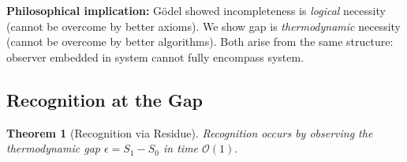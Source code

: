 \documentclass[twocolumn,10pt]{article}
\newtheorem{theorem}{Theorem}[section]
\theoremstyle{definition}
\theoremstyle{remark}
\newcommand{\bigO}{\mathcal{O}}
\begin{document}
\vspace{0.2cm}
\noindent\textbf{Philosophical implication:} Gödel showed incompleteness is \textit{logical} necessity (cannot be overcome by better axioms). We show gap is \textit{thermodynamic} necessity (cannot be overcome by better algorithms). Both arise from the same structure: observer embedded in system cannot fully encompass system.

\subsection{Recognition at the Gap}

\begin{theorem}[Recognition via Residue]
\label{thm:recognition_residue}
Recognition occurs by observing the thermodynamic gap $\epsilon = S_1 - S_0$ in time $\bigO(1)$.
\end{theorem}
\end{document}
